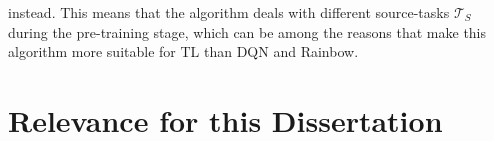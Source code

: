 instead. This means that the algorithm deals with different source-tasks $\mathcal{T}_S$ during the pre-training stage, which can be among the reasons that make this algorithm more suitable for TL than DQN and Rainbow.  


\section{Relevance for this Dissertation}
\label{sec:relevance}

